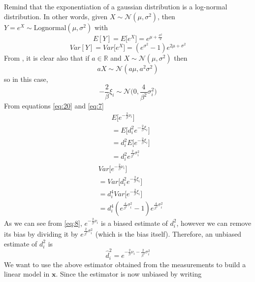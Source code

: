 \documentclass[12pt,twoside]{report}
\begin{document}
Remind that the exponentiation of a gaussian distribution is \cite{Beran2011} a log-normal distribution. In other words, given $X\sim \mathcal{N}(\mu,\sigma^2)$, then $Y=e^X\sim \text{Lognormal}(\mu,\sigma^2)$ with
\begin{equation}
    E[Y]=E\big[e^X\big]=e^{\mu+\frac{\sigma^2}{2}}
    \label{eq:20}
\end{equation}
\begin{equation}
    Var[Y]=Var\big[e^X\big]=(e^{\sigma^2}-1)e^{2\mu+\sigma^2}
    \label{eq:7}
\end{equation}
From \cite{alma9926534668905776}, it is clear also that if $a\in \mathbb{R}$ and $X\sim \mathcal{N}(\mu,\sigma^2)$ then
\begin{equation}
aX\sim \mathcal{N}(a\mu,a^2\sigma^2)    
\end{equation}
so in this case, 
\begin{equation}
    -\frac{2}{\beta}\xi_i\sim \mathcal{N}\bigg(0,\frac{4}{\beta^2}\sigma^2_i\bigg)
\end{equation}
From equations \ref{eq:20} and \ref{eq:7}
\begin{align}
    &E\bigg[e^{-\frac{2}{\beta}\nu_i}\bigg]\\
    &=E\bigg[d_i^2e^{-\frac{2}{\beta}\xi_i}\bigg]\\
    &=d_i^2E\bigg[e^{-\frac{2}{\beta}\xi_i}\bigg]\\ &=d_i^2e^{\frac{2}{\beta^2}\sigma^2_i}
    \label{eq:8}
\end{align}
\begin{align}
    &Var\bigg[e^{-\frac{2}{\beta}\nu_i}\bigg]\\
    &=Var\bigg[d_i^2e^{-\frac{2}{\beta}\xi_i}\bigg]\\
    &=d_i^4Var\bigg[e^{-\frac{2}{\beta}\xi_i}\bigg]\\
    &=d_i^4(e^{\frac{4}{\beta^2}\sigma_i^2}-1)e^{\frac{4}{\beta^2}\sigma^2_i}
    \label{eq:21}
\end{align}
As we can see from \ref{eq:8}, $e^{-\frac{2}{\beta}\nu_i}$ is a biased estimate of $d_i^2$, however we can remove its bias by dividing it by $e^{\frac{2}{\beta^2}\sigma^2_i}$ (which is the bias itself). Therefore, an unbiased estimate of $d_i^2$ is 
\begin{equation}
    \hat{d}_i^2=e^{-\frac{2}{\beta}\nu_i-\frac{2}{\beta^2}\sigma^2_i}
    \label{eq:9}
\end{equation}
We want to use the above estimator obtained from the measurements to build a linear model in $\mathbf{x}$. Since the estimator is now unbiased by writing 
\end{document}
